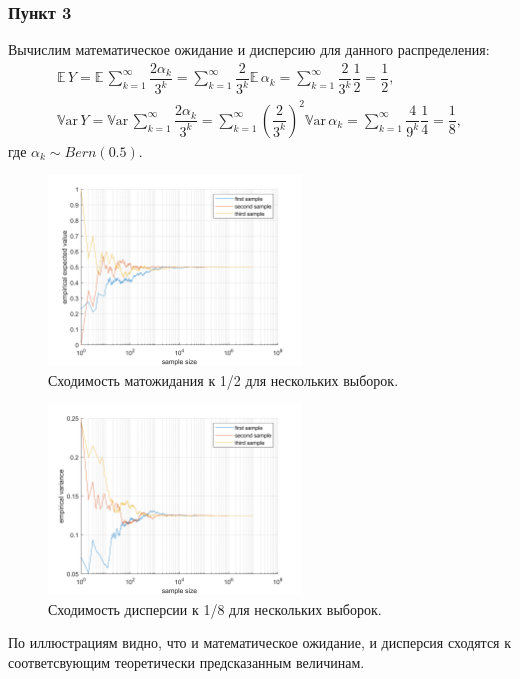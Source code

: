 \documentclass[oneside, final, 12pt]{article}
\def\Var{{\mathbb{V}\textrm{ar}}\,}
\def\E{{\mathbb{E} }\,}
\begin{document}
\subsubsection{Пункт 3}
	Вычислим математическое ожидание и дисперсию для данного распределения:
	$$
		\begin{gathered}
			\E Y= \E \sum\limits_{k=1}^{\infty}\dfrac{2\alpha_k}{3^k}	
				  =  \sum\limits_{k=1}^{\infty}\dfrac{2}{3^k} \E \alpha_k 
				 =  \sum\limits_{k=1}^{\infty}\dfrac{2}{3^k} \dfrac{1}{2} = \dfrac{1}{2}, \\
			\Var Y = \Var \sum\limits_{k=1}^{\infty}\dfrac{2\alpha_k}{3^k}	
				  	  =  \sum\limits_{k=1}^{\infty}\left(\dfrac{2}{3^k}\right)^2 \Var \alpha_k 
				 	  =  \sum\limits_{k=1}^{\infty}\dfrac{4}{9^k} \dfrac{1}{4} = \dfrac{1}{8},
		\end{gathered}
	$$
	где $\alpha_k \sim Bern(0.5)$.
	\begin{figure}[h!]
		\centering
		\includegraphics[width=0.6\textwidth]{../code/Task_2/pict/exp_val_vis_ex.png}
		\caption{Сходимость матожидания к 1/2 для нескольких выборок. }
    \end{figure}
	\newpage
	\begin{figure}[h!]
		\centering
		\includegraphics[width=0.6\textwidth]{../code/Task_2/pict/var_vis_ex.png}
		\caption{Сходимость дисперсии к 1/8 для нескольких выборок. }
    \end{figure}
	По иллюстрациям видно, что и математическое ожидание, и дисперсия сходятся
	к соответсвующим теоретически предсказанным величинам.
\end{document}

